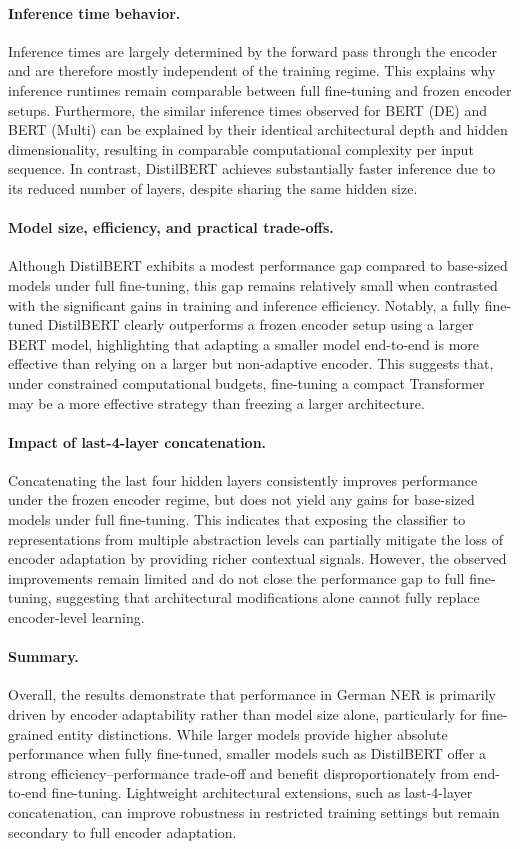 \documentclass[11pt,a4paper,twocolumn]{article}
\begin{document}
\paragraph{Inference time behavior.}
Inference times are largely determined by the forward pass through the encoder and are therefore mostly independent of the training regime. This explains why inference runtimes remain comparable between full fine-tuning and frozen encoder setups. Furthermore, the similar inference times observed for BERT (DE) and BERT (Multi) can be explained by their identical architectural depth and hidden dimensionality, resulting in comparable computational complexity per input sequence. In contrast, DistilBERT achieves substantially faster inference due to its reduced number of layers, despite sharing the same hidden size.

\paragraph{Model size, efficiency, and practical trade-offs.}
Although DistilBERT exhibits a modest performance gap compared to base-sized models under full fine-tuning, this gap remains relatively small when contrasted with the significant gains in training and inference efficiency. Notably, a fully fine-tuned DistilBERT clearly outperforms a frozen encoder setup using a larger BERT model, highlighting that adapting a smaller model end-to-end is more effective than relying on a larger but non-adaptive encoder. This suggests that, under constrained computational budgets, fine-tuning a compact Transformer may be a more effective strategy than freezing a larger architecture.

\paragraph{Impact of last-4-layer concatenation.}
Concatenating the last four hidden layers consistently improves performance under the frozen encoder regime, but does not yield any gains for base-sized models under full fine-tuning. This indicates that exposing the classifier to representations from multiple abstraction levels can partially mitigate the loss of encoder adaptation by providing richer contextual signals. However, the observed improvements remain limited and do not close the performance gap to full fine-tuning, suggesting that architectural modifications alone cannot fully replace encoder-level learning.

\paragraph{Summary.}
Overall, the results demonstrate that performance in German NER is primarily driven by encoder adaptability rather than model size alone, particularly for fine-grained entity distinctions. While larger models provide higher absolute performance when fully fine-tuned, smaller models such as DistilBERT offer a strong efficiency--performance trade-off and benefit disproportionately from end-to-end fine-tuning. Lightweight architectural extensions, such as last-4-layer concatenation, can improve robustness in restricted training settings but remain secondary to full encoder adaptation.
\end{document}

